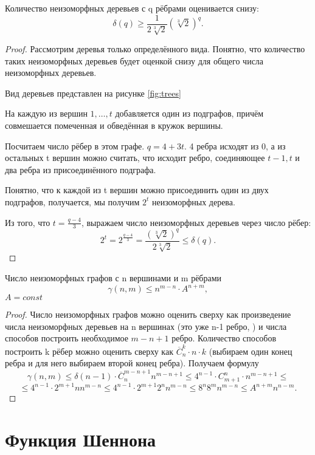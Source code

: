 \begin{theorem}
Количество неизоморфных деревьев с q рёбрами оценивается снизу: \[
	\delta(q) \ge \frac{1}{2 \sqrt[3]{2}}\left( \sqrt[3]{2}  \right) ^q
.\] 
\end{theorem}
\begin{proof}
Рассмотрим деревья только определённого вида. Понятно, что количество таких
неизоморфных деревьев будет оценкой снизу для общего числа неизоморфных
деревьев.

Вид деревьев представлен на рисунке \ref{fig:trees}
\begin{figure*}[h!]
    \centering
    \caption{Вид дерева и присоединяемых поддеревьев.}
    \label{fig:trees}
\end{figure*}

На каждую из вершин $1,\ldots, t$ добавляется один из подграфов, причём
совмешается помеченная и обведённая в кружок вершины. 

Посчитаем число рёбер в этом графе. $q=4+3t$. 4 ребра исходят из 0, а из остальных
t вершин можно считать, что исходит ребро, соединяющее  ${t-1, t}$ и два ребра
из присоединённого подграфа.

Понятно, что к каждой из t вершин можно присоединить один из двух подграфов,
получается, мы получим $2^t$ неизоморфных дерева. 

Из того, что $t = \frac{q-4}{3}$, выражаем число неизоморфных деревьев через число рёбер: \[
	2^t = 2^{\frac{q-4}{3}} = \frac{\left( \sqrt[3]{2}  \right)^q
	}{2\sqrt[3]{2} } \le \delta(q)
.\] 
\end{proof}
\begin{theorem}
	Число неизоморфных графов с n вершинами и m рёбрами \[\gamma(n, m) \le n^{m-n} \cdot
	A^{n+m},\] $A=const$
\end{theorem}
\begin{proof}
Число неизоморфных графов можно оценить сверху как произведение числа
неизоморфных деревьев на n вершинах (это уже n-1 ребро, 	) и числа способов
построить необходимое $m-n+1$ ребро. Количество способов построить k рёбер
можно оценить сверху как $\overline{C}_n^k \cdot  n\cdot k$ (выбираем один конец
ребра и для него выбираем второй конец ребра).
Получаем формулу \[
	\gamma(n, m) \le \delta(n-1) \cdot \overline{C}_n^{m-n+1} n^{m-n+1} \le
	4^{n-1}\cdot C_{m+1}^{n}\cdot n^{m-n+1}\le\] 
	\[
		\le 4^{n-1} \cdot 2^{m+1} n n^{m-n}\le4^{n-1} \cdot 2^{m+1} 2^n
		n^{m-n} \le 8^n 8^m n^{m-n} \le A^{n+m} n^{n-m}
	.\] 
\end{proof}
\section{Функция Шеннона}

